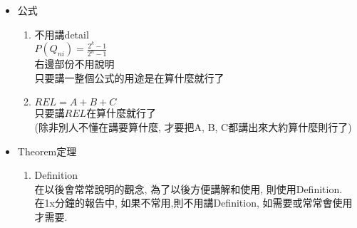 \begin{enumerate}
{\begin{itemize}
{\begin{itemize}
{\begin{enumerate}
              \item
              {
                不要把整個演算法顯示出來一步步講
              } %

              \item
              {
                不要用pseudocode
              } %
            \end{enumerate}
          } %

          \item
          {
            Yes
            \begin{enumerate}
              \item
              {
                盡量使用圖片來講解演算法
              } %
            \end{enumerate}
          } %
        \end{itemize}
      } %

      \item
      {
        公式
        \begin{enumerate}
          \item
          {
            不用講detail\\
            $ P( Q_{ni} ) = \frac{ 2^{k} - 1}{ 2^{n} - 1} $\\
            右邊部份不用說明\\
            只要講一整個公式的用途是在算什麼就行了
          } %

          \item
          {
            $ REL = A + B + C $\\
            只要講$REL$在算什麼就行了\\
            (除非別人不懂在講要算什麼, 才要把A, B, C都講出來大約算什麼則行了)
          } %
        \end{enumerate}
      } %

      \item
      {
        Theorem定理
        \begin{enumerate}
          \item
          {
            Definition\\
            在以後會常常說明的觀念, 為了以後方便講解和使用, 則使用Definition.\\
            在1x分鐘的報告中, 如果不常用,則不用講Definition, 如需要或常常會使用才需要.
          } %


\end{enumerate}}
\end{itemize}}
\end{enumerate}
